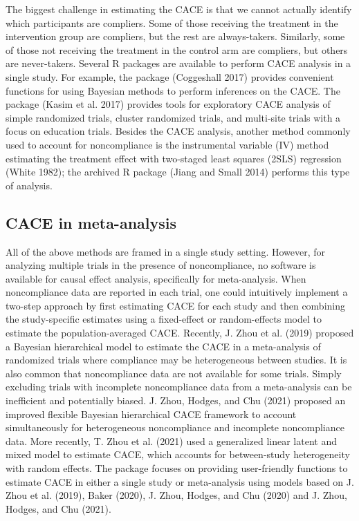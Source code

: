 The biggest challenge in estimating the CACE is that we cannot actually identify which participants are compliers. Some of those receiving the treatment in the intervention group are compliers, but the rest are always-takers. Similarly, some of those not receiving the treatment in the control arm are compliers, but others are never-takers.
Several R packages are available to perform CACE analysis in a single study. For example, the  package (Coggeshall 2017) provides convenient functions for using Bayesian methods to perform inferences on the CACE. The package  (Kasim et al. 2017) provides tools for exploratory CACE analysis of simple randomized trials, cluster randomized trials, and multi-site trials with a focus on education trials. Besides the CACE analysis, another method commonly used to account for noncompliance is the instrumental variable (IV) method estimating the treatment effect with two-staged least squares (2SLS) regression (White 1982); the archived R package  (Jiang and Small 2014) performs this type of analysis.

\hypertarget{cace-in-meta-analysis}{%
\subsection{CACE in meta-analysis}\label{cace-in-meta-analysis}}

All of the above methods are framed in a single study setting. However, for analyzing multiple trials in the presence of noncompliance, no software is available for causal effect analysis, specifically for meta-analysis. When noncompliance data are reported in each trial, one could intuitively implement a two-step approach by first estimating CACE for each study and then combining the study-specific estimates using a fixed-effect or random-effects model to estimate the population-averaged CACE. Recently, J. Zhou et al. (2019) proposed a Bayesian hierarchical model to estimate the CACE in a meta-analysis of randomized trials where compliance may be heterogeneous between studies. It is also common that noncompliance data are not available for some trials. Simply excluding trials with incomplete noncompliance data from a meta-analysis can be inefficient and potentially biased. J. Zhou, Hodges, and Chu (2021) proposed an improved flexible Bayesian hierarchical CACE framework to account simultaneously for heterogeneous noncompliance and incomplete noncompliance data. More recently, T. Zhou et al. (2021) used a generalized linear latent and mixed model to estimate CACE, which accounts for between-study heterogeneity with random effects.
The package  focuses on providing user-friendly functions to estimate CACE in either a single study or meta-analysis using models based on J. Zhou et al. (2019), Baker (2020), J. Zhou, Hodges, and Chu (2020) and J. Zhou, Hodges, and Chu (2021).

